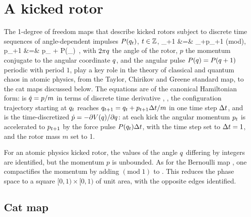 
\section{A kicked rotor}
\label{s:kickRot}

The 1-degree of freedom maps that describe kicked rotors
subject to discrete time sequences of angle-dependent impulses
$P(q_{t})$, $t\in\mathbb{Z}$,
\bea
\coord_{\zeit+1} &=& \coord_{\zeit}+p_{\zeit+1} \qquad  (\mbox{mod}),
    \label{PerViv2.1b}\\
p_{\zeit+1} &=& p_{\zeit} + P(\coord_{\zeit})
\,,
    \label{PerViv2.1a}
\eea
with $2\pi q$ the  angle of the rotor, $p$ the momentum conjugate to
the angular coordinate $q$, and the angular pulse
$P(q)=P(q+1)$ periodic with period $1$, play a key role in the
theory of classical and quantum chaos in  atomic physics, from the
Taylor, Chirikov and Greene  standard map,
to the cat maps discussed below. The equations are of the canonical
Hamiltonian form:  is $\dot{q}=p/m$ in terms of
discrete time derivative , \ie, the configuration
trajectory starting at $q_{t}$ reaches
$q_{t+1}=q_{t}+p_{t+1}\Delta{\ensuremath{t}}/m$ in one time
step $\Delta{\ensuremath{t}}$, and  is the time-discretized
$\dot{p}=-\partial V(q)/\partial q$: at each kick the angular
momentum $p_{t}$ is accelerated to $p_{t+1}$ by the force pulse
$P(q_{t})\Delta{\ensuremath{t}}$, with the time step set to
$\Delta{\ensuremath{t}}=1$, and the rotor mass $m$ set to 1.

For an atomic physics kicked rotor, the values of the angle $q$
differing by integers are identified, but the momentum $p$ is unbounded.
As for the Bernoulli map , one compactifies the
momentum by adding $(\mbox{mod}\;1)$ to . This reduces
the phase space to a square $[0,1)\times [0,1)$ of unit area, with the
opposite edges identified.

\subsection{Cat map}
\label{s:catPV}


